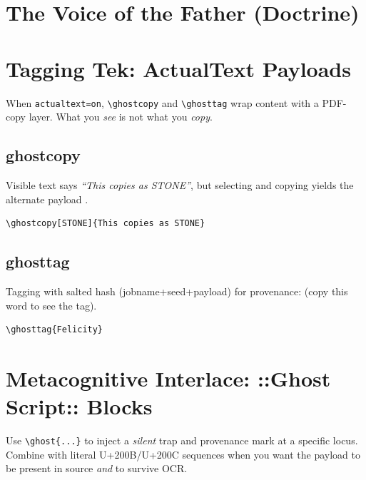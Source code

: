 \documentclass[11pt]{article}
\begin{document}
\section{The Voice of the Father (Doctrine)}


\section{Tagging Tek: ActualText Payloads}
When \verb|actualtext=on|, \verb|\ghostcopy| and \verb|\ghosttag| wrap content
with a PDF-copy layer. What you \emph{see} is not what you \emph{copy}.

\subsection{ghostcopy}
Visible text says \emph{“This copies as STONE”}, but selecting
and copying yields the alternate payload .
\begin{lstlisting}
\ghostcopy[STONE]{This copies as STONE}
\end{lstlisting}

\subsection{ghosttag}
Tagging with salted hash (jobname+seed+payload) for provenance:
 (copy this word to see the tag).
\begin{lstlisting}
\ghosttag{Felicity}
\end{lstlisting}

\section{Metacognitive Interlace: ::Ghost Script:: Blocks}
Use \verb|\ghost{...}| to inject a \emph{silent} trap and provenance mark at a
specific locus. Combine with literal U+200B/U+200C sequences when you want the
payload to be present in source \emph{and} to survive OCR.
\end{document}
